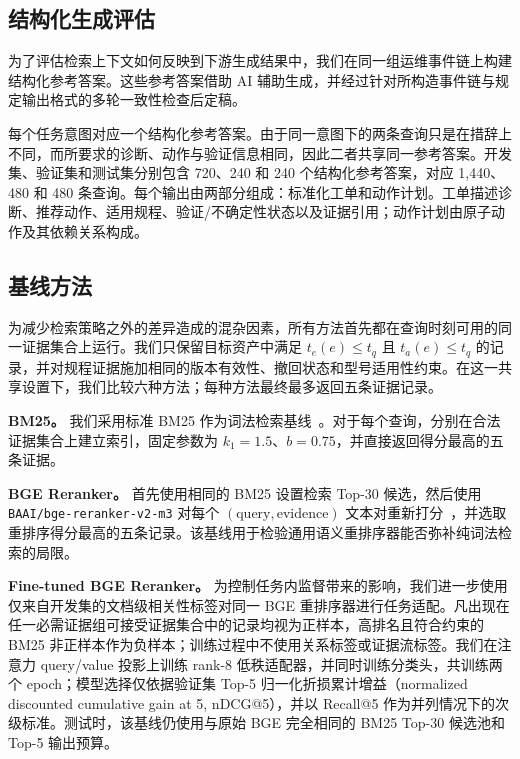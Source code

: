 \subsection{结构化生成评估}

为了评估检索上下文如何反映到下游生成结果中，我们在同一组运维事件链上构建结构化参考答案。这些参考答案借助 AI 辅助生成，并经过针对所构造事件链与规定输出格式的多轮一致性检查后定稿。

每个任务意图对应一个结构化参考答案。由于同一意图下的两条查询只是在措辞上不同，而所要求的诊断、动作与验证信息相同，因此二者共享同一参考答案。开发集、验证集和测试集分别包含 720、240 和 240 个结构化参考答案，对应 1,440、480 和 480 条查询。每个输出由两部分组成：标准化工单和动作计划。工单描述诊断、推荐动作、适用规程、验证/不确定性状态以及证据引用；动作计划由原子动作及其依赖关系构成。

\subsection{基线方法}
\label{sec:baselines}

为减少检索策略之外的差异造成的混杂因素，所有方法首先都在查询时刻可用的同一证据集合上运行。我们只保留目标资产中满足
$t_e(e)\le t_q$ 且 $t_a(e)\le t_q$ 的记录，并对规程证据施加相同的版本有效性、撤回状态和型号适用性约束。在这一共享设置下，我们比较六种方法；每种方法最终最多返回五条证据记录。

\textbf{BM25。}
我们采用标准 BM25 作为词法检索基线~\cite{robertson2009bm25}。对于每个查询，分别在合法证据集合上建立索引，固定参数为 $k_1=1.5$、$b=0.75$，并直接返回得分最高的五条证据。

\textbf{BGE Reranker。}
首先使用相同的 BM25 设置检索 Top-30 候选，然后使用 \texttt{BAAI/bge-reranker-v2-m3} 对每个 $(\text{query},\text{evidence})$ 文本对重新打分~\cite{chen2024bgem3,flagembedding2026reranker}，并选取重排序得分最高的五条记录。该基线用于检验通用语义重排序器能否弥补纯词法检索的局限。

\textbf{Fine-tuned BGE Reranker。}
为控制任务内监督带来的影响，我们进一步使用仅来自开发集的文档级相关性标签对同一 BGE 重排序器进行任务适配。凡出现在任一必需证据组可接受证据集合中的记录均视为正样本，高排名且符合约束的 BM25 非正样本作为负样本；训练过程中不使用关系标签或证据流标签。我们在注意力 query/value 投影上训练 rank-8 低秩适配器，并同时训练分类头，共训练两个 epoch；模型选择仅依据验证集 Top-5 归一化折损累计增益（normalized discounted cumulative gain at 5, nDCG@5），并以 Recall@5 作为并列情况下的次级标准。测试时，该基线仍使用与原始 BGE 完全相同的 BM25 Top-30 候选池和 Top-5 输出预算。

